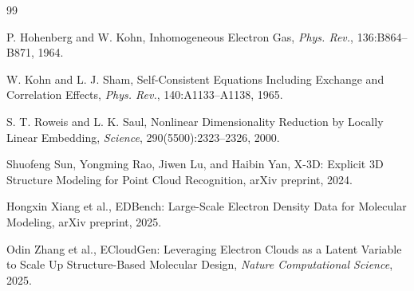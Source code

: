 \documentclass[12pt,a4paper]{ctexart}
\begin{document}
\begin{thebibliography}{99}

P. Hohenberg and W. Kohn,
\newblock Inhomogeneous Electron Gas,
\newblock \emph{Phys. Rev.}, 136:B864--B871, 1964.

W. Kohn and L. J. Sham,
\newblock Self-Consistent Equations Including Exchange and Correlation Effects,
\newblock \emph{Phys. Rev.}, 140:A1133--A1138, 1965.

S. T. Roweis and L. K. Saul,
\newblock Nonlinear Dimensionality Reduction by Locally Linear Embedding,
\newblock \emph{Science}, 290(5500):2323--2326, 2000.

Shuofeng Sun, Yongming Rao, Jiwen Lu, and Haibin Yan,
\newblock X-3D: Explicit 3D Structure Modeling for Point Cloud Recognition,
\newblock arXiv preprint, 2024.

Hongxin Xiang et al.,
\newblock EDBench: Large-Scale Electron Density Data for Molecular Modeling,
\newblock arXiv preprint, 2025.

Odin Zhang et al.,
\newblock ECloudGen: Leveraging Electron Clouds as a Latent Variable to Scale Up Structure-Based Molecular Design,
\newblock \emph{Nature Computational Science}, 2025.

\end{thebibliography}
\end{document}
